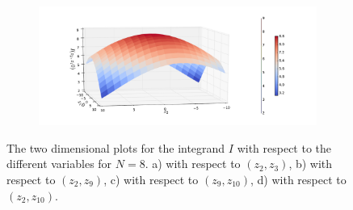 \begin{figure}
\begin{subfigure}{.4\textwidth}
		\caption{}
	\end{subfigure}%
	\begin{subfigure}{.4\textwidth}
		\centering
			\includegraphics[width=1\linewidth]{./figures/basket_call_2d_time_stepping/integrand_plotting/N_8/2d_plots/z_2_10/smoothed_integrand_basket_2D_N_8_z2_10_80}
		\caption{}
		\end{subfigure}
	\caption{The two dimensional plots for the integrand $I$ with respect to the different variables for $N=8$. a) with respect to $(z_2,z_3)$, b) with respect to $(z_2,z_9)$, c) with respect to $(z_9,z_{10})$,  d) with respect to $(z_2,z_{10})$.}
	\label{fig:integrand_two_dim_N_8}
\end{figure}
\FloatBarrier